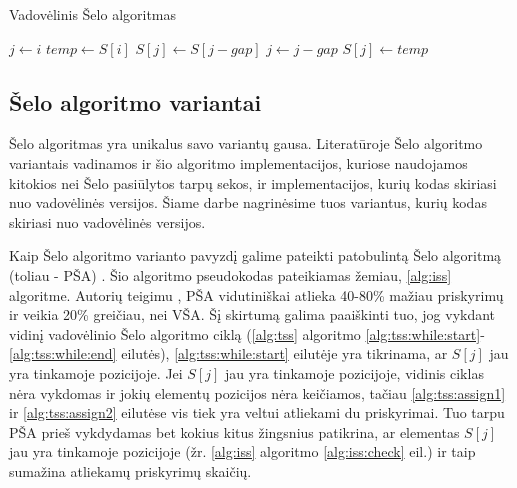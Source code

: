 \documentclass{VUMIFInfKursinis}
\begin{document}
\begin{algorithm}[H]
  \caption{Vadovėlinis Šelo algoritmas}\label{alg:tss}
  \begin{algorithmic}[1]
      \State $j\gets i$
      \State $temp\gets S[i]$\label{alg:tss:assign1}
      \label{alg:tss:while:start}
        \State $S[j]\gets S[j - gap]$
        \State $j\gets j-gap$
      \EndWhile\label{alg:tss:while:end}
      \State $S[j]\gets temp$\label{alg:tss:assign2}
    \EndFor
  \EndFor
  \end{algorithmic}
\end{algorithm}


\subsection{Šelo algoritmo variantai}

Šelo algoritmas yra unikalus savo variantų gausa.
Literatūroje Šelo algoritmo variantais vadinamos ir šio algoritmo implementacijos, kuriose naudojamos
kitokios nei Šelo pasiūlytos tarpų sekos, ir implementacijos, kurių kodas skiriasi nuo vadovėlinės versijos.  
Šiame darbe nagrinėsime tuos variantus, kurių kodas skiriasi nuo vadovėlinės versijos.

Kaip Šelo algoritmo varianto pavyzdį galime pateikti patobulintą Šelo algoritmą (toliau - PŠA) \cite{Radavičius_Baranauskas_2013}.
Šio algoritmo pseudokodas pateikiamas žemiau, \ref{alg:iss} algoritme.
Autorių teigimu \cite{Radavičius_Baranauskas_2013}, PŠA vidutiniškai atlieka 40-80\% mažiau priskyrimų ir veikia 20\% greičiau, nei VŠA.
Šį skirtumą galima paaiškinti tuo, jog vykdant vidinį vadovėlinio Šelo algoritmo ciklą (\ref{alg:tss} algoritmo \ref{alg:tss:while:start}-\ref{alg:tss:while:end} eilutės),
\ref{alg:tss:while:start} eilutėje yra tikrinama, ar $S[j]$ jau yra tinkamoje pozicijoje.
Jei $S[j]$ jau yra tinkamoje pozicijoje, vidinis ciklas nėra vykdomas ir jokių elementų pozicijos nėra keičiamos,
tačiau \ref{alg:tss:assign1} ir \ref{alg:tss:assign2} eilutėse vis tiek yra veltui atliekami du priskyrimai.
Tuo tarpu PŠA prieš vykdydamas bet kokius kitus žingsnius patikrina, ar elementas $S[j]$ jau yra tinkamoje pozicijoje
(žr. \ref{alg:iss} algoritmo \ref{alg:iss:check} eil.) ir taip sumažina atliekamų priskyrimų skaičių.
\end{document}
